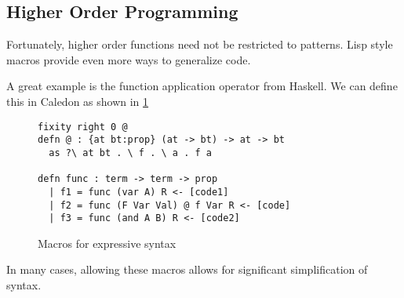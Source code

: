 \FloatBarrier
\subsection{Higher Order Programming}

Fortunately, higher order functions need not be restricted to patterns.  Lisp style macros provide even more ways
to generalize code.  

A great example is the function application operator from Haskell.  
We can define this in Caledon as shown in \ref{code:macros}

\begin{figure}[H]
\begin{lstlisting}
fixity right 0 @
defn @ : {at bt:prop} (at -> bt) -> at -> bt
  as ?\ at bt . \ f . \ a . f a

defn func : term -> term -> prop 
  | f1 = func (var A) R <- [code1]
  | f2 = func (F Var Val) @ f Var R <- [code]
  | f3 = func (and A B) R <- [code2]
\end{lstlisting}
\caption{Macros for expressive syntax}
\label{code:macros}
\end{figure}

In many cases, allowing these macros allows for significant simplification of syntax.
